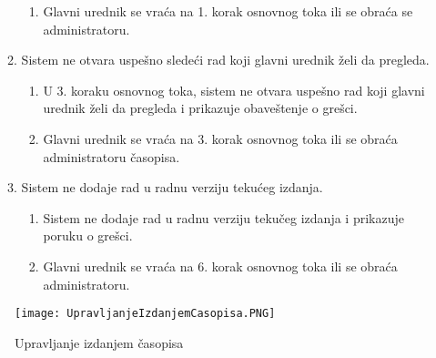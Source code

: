 \documentclass[a4paper]{article}
\begin{document}
\begin{itemize}
\begin{enumerate}
\begin{enumerate}
                    \item Glavni urednik se vraća na 1. korak osnovnog toka ili se obraća se administratoru.
                \end{enumerate}
            \item Sistem ne otvara uspešno sledeći rad koji glavni urednik želi da pregleda.
                \begin{enumerate}
                    \item U 3. koraku osnovnog toka, sistem ne otvara uspešno rad koji glavni urednik želi da pregleda i prikazuje obaveštenje o grešci.
                    \item Glavni urednik se vraća na 3. korak osnovnog toka ili se obraća administratoru časopisa.
                \end{enumerate}
            \item Sistem ne dodaje rad u radnu verziju tekućeg izdanja.
            \begin{enumerate}
                \item Sistem ne dodaje rad u radnu verziju tekučeg izdanja i prikazuje poruku o grešci.
                \item Glavni urednik se vraća na 6. korak osnovnog toka ili se obraća administratoru.
            \end{enumerate}
        \end{enumerate}
\end{itemize}

\begin{figure}[hbt!]
    \centering
    \texttt{[image: UpravljanjeIzdanjemCasopisa.PNG]}
    \caption{Upravljanje izdanjem časopisa}
    \label{fig:my_label}
\end{figure}
\end{document}
